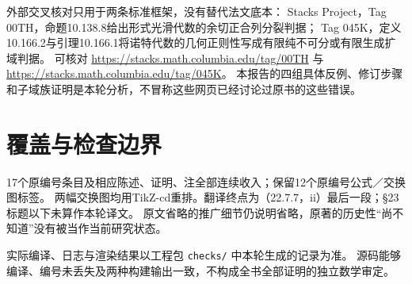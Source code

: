 外部交叉核对只用于两条标准框架，没有替代法文底本：
Stacks Project，Tag 00TH，命题10.138.8给出形式光滑代数的余切正合列分裂判据；
Tag 045K，定义10.166.2与引理10.166.1将诺特代数的几何正则性写成有限纯不可分或有限生成扩域判据。
可核对 \url{https://stacks.math.columbia.edu/tag/00TH} 与
\url{https://stacks.math.columbia.edu/tag/045K}。
本报告的四组具体反例、修订步骤和子域族证明是本轮分析，不冒称这些网页已经讨论过原书的这些错误。

\section*{覆盖与检查边界}
17个原编号条目及相应陈述、证明、注全部连续收入；保留12个原编号公式／交换图标签。
两幅交换图均用TikZ-cd重排。翻译终点为（22.7.7，ii）最后一段；§23标题以下未算作本轮译文。
原文省略的推广细节仍说明省略，原著的历史性“尚不知道”没有被当作当前研究状态。

实际编译、日志与渲染结果以工程包 \texttt{checks/} 中本轮生成的记录为准。
源码能够编译、编号未丢失及两种构建输出一致，不构成全书全部证明的独立数学审定。
